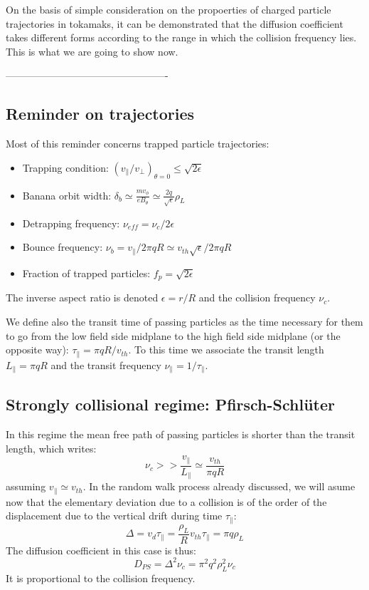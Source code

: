 On the basis of simple consideration on the propoerties of charged particle trajectories in tokamaks, it can be demonstrated that the diffusion coefficient takes different forms according to the range in which the collision frequency lies. This is what we are going to show now.


-------------------------------------------------

				
				\subsection{Reminder on trajectories}
				\label{subsub:RappelsTrajectoires}
						
Most of this reminder concerns trapped particle trajectories:
\begin{itemize}
		\item Trapping condition:	$\left( v_\| / v_{\bot} \right)_{\theta = 0} \leq \sqrt{2\epsilon}$
		\item Banana orbit width:	$\delta_b \simeq \frac{mv_\phi}{eB_\theta} \simeq \frac{2q}{\sqrt{\epsilon}}\rho_L$
		\item Detrapping frequency:	$\nu_{eff} = \nu_c/2\epsilon$
		\item Bounce frequency:	$\nu_b = v_\| / 2\pi q R \simeq v_{th}\sqrt{\epsilon} / 2\pi q R$
		\item Fraction of trapped particles: $f_p = \sqrt{2\epsilon}$
\end{itemize}
The inverse aspect ratio is denoted $\epsilon = r/R$ and the collision frequency $\nu_c$.

We define also the transit time of passing particles as the time necessary for them to go from the low field side midplane to the high field side midplane (or the opposite way): $\tau_\| = \pi q R / v_{th}$. To this time we associate the transit length $L_\| = \pi q R$ and the transit frequency $\nu_\| = 1/\tau_\|$.
						
						
				\subsection{Strongly collisional regime: Pfirsch-Schlüter}
				\label{RegimePfirschSchluter}
	
In this regime the mean free path of passing particles is shorter than the transit length, which writes:
\[
		\nu_c >> \frac{v_\|}{L_\|} \simeq \frac{v_{th}}{\pi qR}
\]
assuming $v_\| \simeq v_{th}$. In the random walk process already discussed, we will asume now that the elementary deviation due to a collision is of the order of the displacement due to the vertical drift during time $\tau_\|$:
\[
		\Delta = v_d \tau_\| = \frac{\rho_L}{R}v_{th}\tau_\| = \pi q \rho_L
\]
The diffusion coefficient in this case is thus:
\[
		D_{PS} = \Delta^2 \nu_c = \pi^2 q^2 \rho_L^2 \nu_c
\]
It is proportional to the collision frequency.



